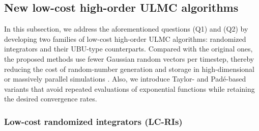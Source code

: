 \documentclass[12pt]{article}
\numberwithin{equation}{section}
\begin{document}


\subsection{New low-cost high-order ULMC algorithms}
%

In this subsection, we address the aforementioned questions (Q1) and (Q2) by developing two families of low-cost high-order
ULMC algorithms: randomized integrators and their UBU-type
counterparts. Compared with the original ones, the proposed methods use fewer Gaussian random vectors per timestep, thereby
reducing the cost of random-number generation and storage in
high-dimensional or massively parallel simulations
\cite{vono2022high,manssen2012random,gross2018massively}. Also, we
introduce Taylor- and Pad\'e-based variants that avoid repeated
evaluations of exponential functions while retaining the desired convergence rates.




\subsubsection{Low-cost randomized integrators (LC-RIs)}
\end{document}

